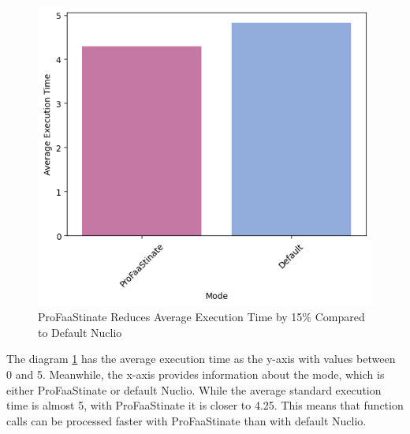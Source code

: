 \begin{figure}
    \centering
    \includegraphics[width=\linewidth]{figures/profaastinate/results/execution_time_chart.png}
    \caption{ProFaaStinate Reduces Average Execution Time by 15\% Compared to Default Nuclio}
    \label{fig:execution-time-comparision}
\end{figure}

The diagram \ref{fig:execution-time-comparision} has the average execution time as the y-axis with values between 0 and 5. Meanwhile, the x-axis provides information about the mode, which is either ProFaaStinate or default Nuclio. While the average standard execution time is almost 5, with ProFaaStinate it is closer to 4.25. This means that function calls can be processed faster with ProFaaStinate than with default Nuclio.

